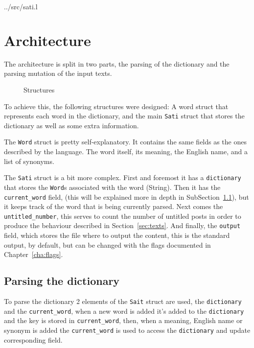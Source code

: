 \documentclass[a4paper]{report}
\begin{document}

{../src/sati.l}

\section{Architecture}

The architecture is split in two parts, the parsing of the dictionary and the
parsing mutation of the input texts.

\begin{figure}
    \centering
    
    \caption{Structures}
\end{figure}

To achieve this, the following structures were designed: A word struct
that represents each word in the dictionary, and the main \texttt{Sati} struct
that stores the dictionary as well as some extra information.

The \texttt{Word} struct is pretty self-explanatory. It contains the same fields
as the ones described by the language. The word itself, its meaning, the
English name, and a list of synonyms.

The \texttt{Sati} struct is a bit more complex. First and foremost it has a
\texttt{dictionary} that stores the \texttt{Word}s associated with the word
(String). Then it has the \texttt{current\_word} field, (this will be
explained more in depth in SubSection~\ref{ssec:parsing-the-dict}), but it
keeps track of the word that is being currently parsed. Next comes the
\texttt{untitled\_number}, this serves to count the number of untitled posts in
order to produce the behaviour described in Section~\ref{sec:texts}. And
finally, the \texttt{output} field, which stores the file where to output the
content, this is the standard output, by default, but can be changed with the
flags documented in Chapter~\ref{cha:flags}.

\subsection{Parsing the dictionary}\label{ssec:parsing-the-dict}

To parse the dictionary 2 elements of the \texttt{Sait} struct are used, the
\texttt{dictionary} and the \texttt{current\_word}, when a new word is added
it's added to the \texttt{dictionary} and the key is stored in
\texttt{current\_word}, then, when a meaning, English name or synonym is added
the \texttt{current\_word} is used to access the \texttt{dictionary} and update
corresponding field.
\end{document}
